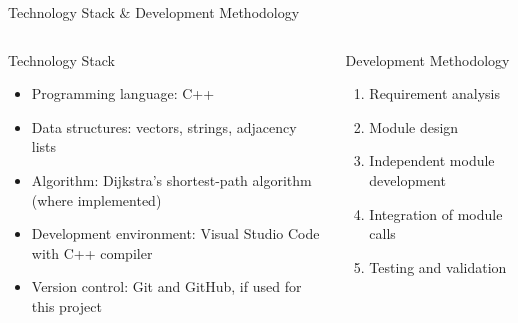 \documentclass[aspectratio=169,10pt]{beamer}
\begin{document}
\begin{frame}{Technology Stack \& Development Methodology}
\begin{columns}[T,totalwidth=\textwidth]
\begin{block}{Technology Stack}
\begin{itemize}\itemsep3pt
\item Programming language: C++
\item Data structures: vectors, strings, adjacency lists
\item Algorithm: Dijkstra's shortest-path algorithm (where implemented)
\item Development environment: Visual Studio Code with C++ compiler
\item Version control: Git and GitHub, if used for this project
\end{itemize}
\end{block}
\begin{block}{Development Methodology}
\begin{enumerate}\itemsep3pt
\item Requirement analysis
\item Module design
\item Independent module development
\item Integration of module calls
\item Testing and validation
\end{enumerate}
\end{block}
\end{columns}

\end{frame}
\end{document}
